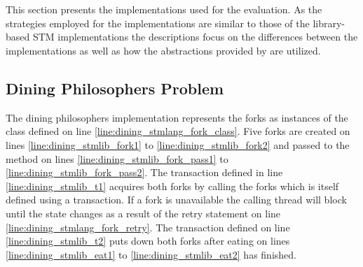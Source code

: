 \section{\stmname}\label{app:impl_stm_lab}
This section presents the \stmname implementations used for the evaluation. As the strategies employed for the \stmname implementations are similar to those of the library-based \ac{STM} implementations the descriptions focus on the differences between the implementations as well as how the abstractions provided by \stmname are utilized.

\subsection{Dining Philosophers Problem}
The \stmname dining philosophers implementation represents the forks as instances of the  class defined on line \ref{line:dining_stmlang_fork_class}. Five forks are created on lines \ref{line:dining_stmlib_fork1} to \ref{line:dining_stmlib_fork2} and passed to the  method on lines \ref{line:dining_stmlib_fork_pass1} to \ref{line:dining_stmlib_fork_pass2}. The transaction defined in line \ref{line:dining_stmlib_t1} acquires both forks by calling the forks  which is itself defined using a transaction. If a fork is unavailable the calling thread will block until the state changes as a result of the retry statement on line \ref{line:dining_stmlang_fork_retry}. The transaction defined on line \ref{line:dining_stmlib_t2} puts down both forks after eating on lines \ref{line:dining_stmlib_eat1} to \ref{line:dining_stmlib_eat2} has finished.



